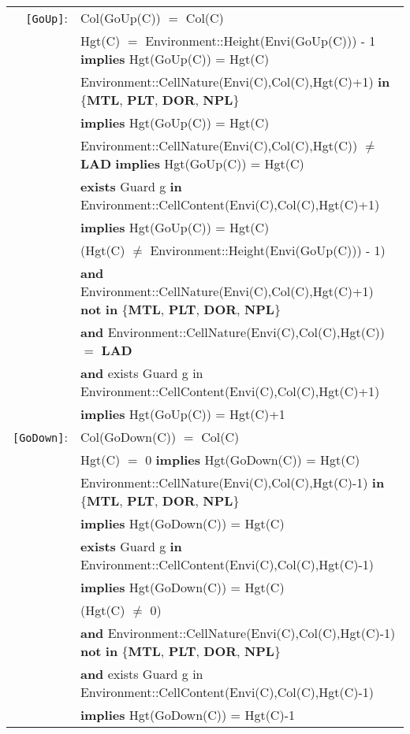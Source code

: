 \documentclass[7pt]{article}
\begin{document}
\begin{tabular}{rl}
\texttt{[GoUp]}: & \textrm{Col(GoUp(C))} $=$ \textrm{Col(C)}\\
& \textrm{Hgt(C)} $=$ Environment::Height(Envi(GoUp(C))) - 1 \textbf{implies} \textrm{Hgt(GoUp(C))} = \textrm{Hgt(C)} \\
& \textrm{Environment::CellNature(Envi(C),Col(C),Hgt(C)+1)} \textbf{in} \{\textbf{MTL}, \textbf{PLT}, \textbf{DOR}, \textbf{NPL}\} \\
& \quad \textbf{implies} \textrm{Hgt(GoUp(C))} = \textrm{Hgt(C)} \\
& \textrm{Environment::CellNature(Envi(C),Col(C),Hgt(C))} $\neq$ \textbf{LAD} \textbf{implies} \textrm{Hgt(GoUp(C))} = \textrm{Hgt(C)} \\
& \textbf{exists} \textrm{Guard} g \textbf{in} \textrm{Environment::CellContent(Envi(C),Col(C),Hgt(C)+1)} \\ & \quad\quad \textbf{implies} \textrm{Hgt(GoUp(C))} = \textrm{Hgt(C)}  \\
& (\textrm{Hgt(C)} $\neq$ Environment::Height(Envi(GoUp(C))) - 1) \\ 
&  \quad\quad \textbf{and} \textrm{Environment::CellNature(Envi(C),Col(C),Hgt(C)+1)} \textbf{not} \textbf{in} \{\textbf{MTL}, \textbf{PLT}, \textbf{DOR}, \textbf{NPL}\} \\ 
& \quad\quad  \textbf{and} \textrm{Environment::CellNature(Envi(C),Col(C),Hgt(C))} $=$ \textbf{LAD} \\
& \quad\quad  \textbf{and} {exists} \textrm{Guard} g {in} \textrm{Environment::CellContent(Envi(C),Col(C),Hgt(C)+1)} \\ & \quad\quad \textbf{implies} \textrm{Hgt(GoUp(C))} = \textrm{Hgt(C)}+1  \\

\texttt{[GoDown]}: & \textrm{Col(GoDown(C))} $=$ \textrm{Col(C)}\\
& \textrm{Hgt(C)} $=$ 0 \textbf{implies} \textrm{Hgt(GoDown(C))} = \textrm{Hgt(C)} \\
& \textrm{Environment::CellNature(Envi(C),Col(C),Hgt(C)-1)} \textbf{in} \{\textbf{MTL}, \textbf{PLT}, \textbf{DOR}, \textbf{NPL}\} \\
& \quad \textbf{implies} \textrm{Hgt(GoDown(C))} = \textrm{Hgt(C)} \\
& \textbf{exists} \textrm{Guard} g \textbf{in} \textrm{Environment::CellContent(Envi(C),Col(C),Hgt(C)-1)} \\ & \quad\quad \textbf{implies} \textrm{Hgt(GoDown(C))} = \textrm{Hgt(C)}  \\
& (\textrm{Hgt(C)} $\neq$ 0) \\ 
&  \quad\quad \textbf{and} \textrm{Environment::CellNature(Envi(C),Col(C),Hgt(C)-1)} \textbf{not} \textbf{in} \{\textbf{MTL}, \textbf{PLT}, \textbf{DOR}, \textbf{NPL}\} \\ 
& \quad\quad  \textbf{and} {exists} \textrm{Guard} g {in} \textrm{Environment::CellContent(Envi(C),Col(C),Hgt(C)-1)} \\ & \quad\quad \textbf{implies} \textrm{Hgt(GoDown(C))} = \textrm{Hgt(C)}-1  \\
\end{tabular}
\end{document}

